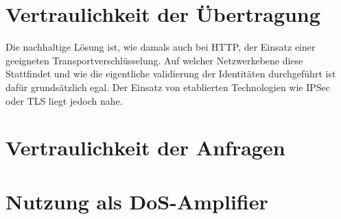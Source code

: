 
\section{ Vertraulichkeit der Übertragung}

Die nachhaltige Lösung ist, wie damals auch bei HTTP, der Einsatz einer geeigneten Transportverschlüsselung. Auf welcher Netzwerkebene diese Stattfindet und wie die eigentliche validierung der Identitäten durchgeführt ist dafür grundsätzlich egal. Der Einsatz von etablierten Technologien wie IPSec oder TLS liegt jedoch nahe.


\section{Vertraulichkeit der Anfragen}

\section{Nutzung als DoS-Amplifier}



